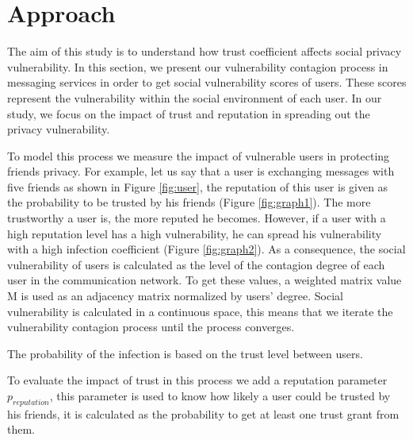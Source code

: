 \section{Approach} \label{sec:Approach}

The aim of this study is to understand how trust coefficient affects social privacy vulnerability.
In this section,
	we present our vulnerability contagion process in messaging services in order to get social vulnerability scores of users.
These scores represent the vulnerability within the social environment of each user.
In our study,
	we focus on the impact of trust and reputation in spreading out the privacy vulnerability.

To model this process we measure the impact of vulnerable users in protecting friends privacy.
For example,
	let us say that a user is exchanging messages with five friends as shown in Figure \ref{fig:user},
	the reputation of this user is given as the probability to be trusted by his friends (Figure \ref{fig:graph1}).
The more trustworthy a user is,
	the more reputed he becomes.
However,
	if a user with a high reputation level has a high vulnerability,
	he can spread his vulnerability with a high infection coefficient (Figure \ref{fig:graph2}).
As a consequence,
	the social vulnerability of users is calculated as the level of the contagion degree of each user in the communication network.
To get these values,
	a weighted matrix value M is used as an adjacency matrix normalized by users' degree.
Social vulnerability is calculated in a continuous space,
	this means that we iterate the vulnerability contagion process until the process converges.%

The probability of the infection is based on the trust level between users.



To evaluate the impact of trust in this process we add a reputation parameter $p_{reputation}$,
	this parameter is used to know how likely a user could be trusted by his friends,
	it is calculated as the probability to get at least one trust grant from them.


